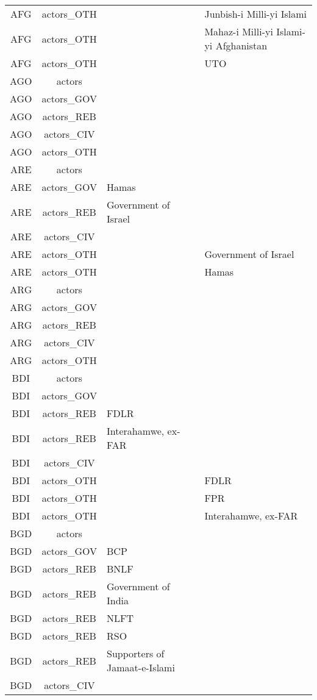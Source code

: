 \documentclass[12pt]{article}
\begin{document}
\begin{center}
\begin{longtable}{|c|c|p{7cm}|p{7cm}|}
  AFG & actors\_OTH &  & Junbish-i Milli-yi Islami \\ 
  AFG & actors\_OTH &  & Mahaz-i Milli-yi Islami-yi Afghanistan \\ 
  AFG & actors\_OTH &  & UTO \\ 
  AGO & actors &  &  \\ 
  AGO & actors\_GOV &  &  \\ 
  AGO & actors\_REB &  &  \\ 
  AGO & actors\_CIV &  &  \\ 
  AGO & actors\_OTH &  &  \\ 
  ARE & actors &  &  \\ 
  ARE & actors\_GOV & Hamas &  \\ 
  ARE & actors\_REB & Government of Israel &  \\ 
  ARE & actors\_CIV &  &  \\ 
  ARE & actors\_OTH &  & Government of Israel \\ 
  ARE & actors\_OTH &  & Hamas \\ 
  ARG & actors &  &  \\ 
  ARG & actors\_GOV &  &  \\ 
  ARG & actors\_REB &  &  \\ 
  ARG & actors\_CIV &  &  \\ 
  ARG & actors\_OTH &  &  \\ 
  BDI & actors &  &  \\ 
  BDI & actors\_GOV &  &  \\ 
  BDI & actors\_REB & FDLR &  \\ 
  BDI & actors\_REB & Interahamwe, ex-FAR &  \\ 
  BDI & actors\_CIV &  &  \\ 
  BDI & actors\_OTH &  & FDLR \\ 
  BDI & actors\_OTH &  & FPR \\ 
  BDI & actors\_OTH &  & Interahamwe, ex-FAR \\ 
  BGD & actors &  &  \\ 
  BGD & actors\_GOV & BCP &  \\ 
  BGD & actors\_REB & BNLF &  \\ 
  BGD & actors\_REB & Government of India &  \\ 
  BGD & actors\_REB & NLFT &  \\ 
  BGD & actors\_REB & RSO &  \\ 
  BGD & actors\_REB & Supporters of Jamaat-e-Islami &  \\ 
  BGD & actors\_CIV &  &  \\ 

\end{longtable}
\end{center}
\end{document}
